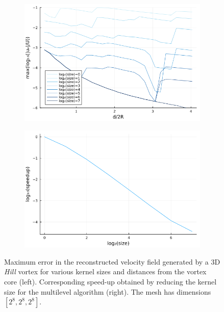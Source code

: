 \documentclass[preprint,12pt]{elsarticle}
\begin{document}
\begin{figure}
    \centering
    \begin{subfigure}{.5\textwidth}
        \centering
        \includegraphics[width=\textwidth]{tex//fig/Hill_error_dists.png}
    \end{subfigure}%
    \begin{subfigure}{.5\textwidth}
        \centering
        \includegraphics[width=\textwidth]{tex/fig/Hill_speedup_dists.png}
    \end{subfigure}
    \caption{Maximum error in the reconstructed velocity field generated by a 3D \emph{Hill} vortex for various kernel sizes and distances from the vortex core (left). Corresponding speed-up obtained by reducing the kernel size for the multilevel algorithm (right). The mesh has dimensions $[2^8,2^8,2^8]$.}
    \label{fig:error_hill_3}
\end{figure}
\end{document}
